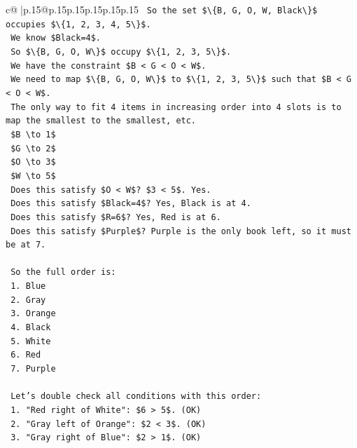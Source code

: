 \documentclass{article}
\begin{document}
{\begin{supertabular}{c@{$\;$}|p{.15\linewidth}@{}p{.15\linewidth}p{.15\linewidth}p{.15\linewidth}p{.15\linewidth}p{.15\linewidth}}
{{{\texttt{    So the set \$\textbackslash{}\{B, G, O, W, Black\textbackslash{}\}\$ occupies \$\textbackslash{}\{1, 2, 3, 4, 5\textbackslash{}\}\$.} \\
\texttt{    We know \$Black=4\$.} \\
\texttt{    So \$\textbackslash{}\{B, G, O, W\textbackslash{}\}\$ occupy \$\textbackslash{}\{1, 2, 3, 5\textbackslash{}\}\$.} \\
\texttt{    We have the constraint \$B < G < O < W\$.} \\
\texttt{    We need to map \$\textbackslash{}\{B, G, O, W\textbackslash{}\}\$ to \$\textbackslash{}\{1, 2, 3, 5\textbackslash{}\}\$ such that \$B < G < O < W\$.} \\
\texttt{    The only way to fit 4 items in increasing order into 4 slots is to map the smallest to the smallest, etc.} \\
\texttt{    \$B \textbackslash{}to 1\$} \\
\texttt{    \$G \textbackslash{}to 2\$} \\
\texttt{    \$O \textbackslash{}to 3\$} \\
\texttt{    \$W \textbackslash{}to 5\$} \\
\texttt{    Does this satisfy \$O < W\$? \$3 < 5\$. Yes.} \\
\texttt{    Does this satisfy \$Black=4\$? Yes, Black is at 4.} \\
\texttt{    Does this satisfy \$R=6\$? Yes, Red is at 6.} \\
\texttt{    Does this satisfy \$Purple\$? Purple is the only book left, so it must be at 7.} \\
\\ 
\texttt{    So the full order is:} \\
\texttt{    1. Blue} \\
\texttt{    2. Gray} \\
\texttt{    3. Orange} \\
\texttt{    4. Black} \\
\texttt{    5. White} \\
\texttt{    6. Red} \\
\texttt{    7. Purple} \\
\\ 
\texttt{    Let's double check all conditions with this order:} \\
\texttt{    1. "Red right of White": \$6 > 5\$. (OK)} \\
\texttt{    2. "Gray left of Orange": \$2 < 3\$. (OK)} \\
\texttt{    3. "Gray right of Blue": \$2 > 1\$. (OK)} \\
}}}
\end{supertabular}}
\end{document}
